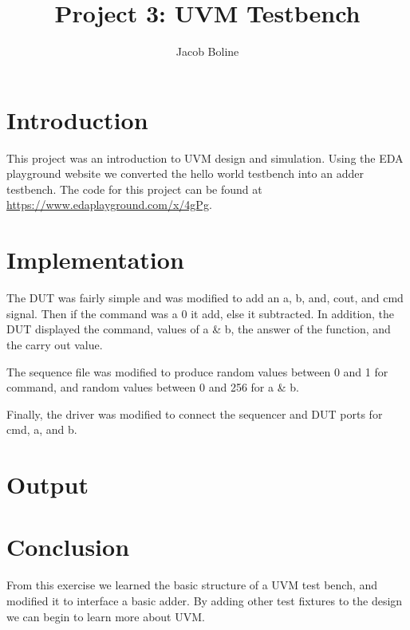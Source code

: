 \documentclass[11pt]{article}
\title{Project 3: UVM Testbench}
\author{Jacob Boline}
\begin{document}
\maketitle

\section{Introduction}
This project was an introduction to UVM design and simulation. Using the EDA playground website we converted the hello world testbench into an adder testbench. The code for this project can be found at \url{https://www.edaplayground.com/x/4gPg}.
 
\section{Implementation}
The DUT was fairly simple and was modified to add an a, b, and, cout, and cmd signal. Then if the command was a 0 it add, else it subtracted. In addition, the DUT displayed the command, values of a \& b, the answer of the function, and the carry out value.

The sequence file was modified to produce random values between 0 and 1 for command, and random values between 0 and 256 for a \& b.

Finally, the driver was modified to connect the sequencer and DUT ports for cmd, a, and b.

\section{Output}


\section{Conclusion}
From this exercise we learned the basic structure of a UVM test bench, and modified it to interface a basic adder. By adding other test fixtures to the design we can begin to learn more about UVM.
\end{document}
